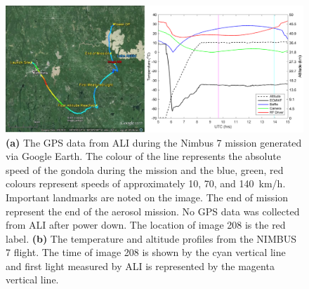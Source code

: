 \documentclass[12pt, notitlepage]{article}
\begin{document}
\hrulefill

\begin{figure}[H]
\includegraphics[width=120mm]{amt-2015-329-discussions-f08.pdf}
\caption{\textbf{(a)} The GPS data from ALI during the Nimbus 7
  mission generated via Google Earth. The colour of the line
  represents the absolute speed of the gondola during the
  mission and the blue, green, red colours represent speeds of approximately
  10, 70, and 140~km/h. Important landmarks are noted on the image.  The end of
  mission represent the end of the aerosol mission. No GPS data was
  collected from ALI after power down. The location of image 208 is
  the red label. \textbf{(b)} The temperature and altitude profiles
  from the NIMBUS 7 flight.  The time of image 208 is shown by the
  cyan vertical line and first light measured by ALI is represented by the
  magenta vertical line.}
\label{amtd-2015-0329-f08.pdf}
\end{figure}
\end{document}

